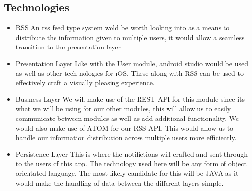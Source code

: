 \documentclass{article}
\begin{document}
			\subsection{Technologies}
				\begin{itemize}
				\item	RSS
				An rss feed type system wold be worth looking into as a means to distribute the information given to multiple users, it would allow a seamless transition to the presentation layer
				\item Presentation Layer
				Like with the User module, android studio would be used as well as other tech nologies for iOS. These along with RSS can be used to effectively craft a visually pleasing experience.

				\item Business Layer
				We will make use of the REST API for this module since its what we will be using for our other modules, this will allow us to easily communicate between modules as well as add additional functionality. We would also make use of ATOM for our RSS API. This would allow us to handle our information distribution across multiple users more efficiently.
				
				\item Persistence Layer
				This is where the notifictions will crafted and sent through to the users of this app. The technology used here will be any form of object orientated language, The most likely candidate for this will be JAVA as it would make the handling of data between the different layers simple.	
				\end{itemize}
			
\end{document}
